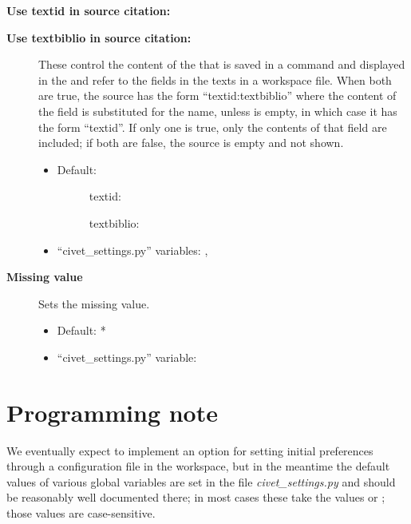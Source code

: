 \documentclass[letterpaper,10pt,english]{sphinxmanual}
\begin{document}
\textbf{Use textid in source citation:}
\begin{description}
\item[{\textbf{Use textbiblio in source citation:}}] \leavevmode
These control the content of the  that is saved in a 
command and displayed in the   and 
refer to the fields in the texts in a workspace file. When both are true,
the source has the form “textid:textbiblio” where the content of the
field is substituted for the name, unless  is empty, in which
case it has the form “textid”. If only one is true, only
the contents of that field are included; if both are false, the source is
empty and not shown.
\begin{itemize}
\item {} \begin{description}
\item[{Default:}] \leavevmode
textid: 

textbiblio: 

\end{description}

\item {} 
“civet\_settings.py” variables: , 

\end{itemize}

\item[{\textbf{Missing value}}] \leavevmode
Sets the missing value.
\begin{itemize}
\item {} 
Default: *

\item {} 
“civet\_settings.py” variable: 

\end{itemize}

\end{description}


\section{Programming note}
\label{preferences:programming-note}
We eventually expect to implement an option for setting initial preferences
through a configuration file in the workspace, but in the meantime the default
values of various global variables are set in the file
\emph{civet\_settings.py} and should be reasonably well documented there; in most
cases these take the values  or ; those values are
case-sensitive.
\end{document}
